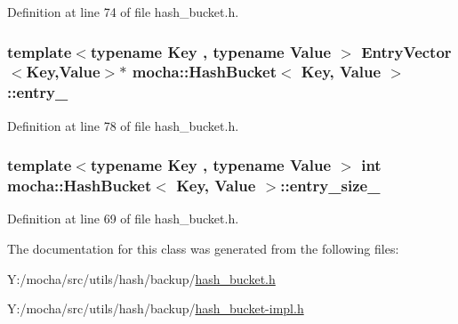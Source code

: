Definition at line 74 of file hash\_\-bucket.h.

\hypertarget{classmocha_1_1_hash_bucket_ab72765abd9c87c46dfe2994872527cbe}{
\subsubsection[{entry\_\-}]{\setlength{\rightskip}{0pt plus 5cm}template$<$typename Key , typename Value $>$ {\bf EntryVector}$<$Key,Value$>$$\ast$ {\bf mocha::HashBucket}$<$ Key, Value $>$::{\bf entry\_\-}}}
\label{classmocha_1_1_hash_bucket_ab72765abd9c87c46dfe2994872527cbe}


Definition at line 78 of file hash\_\-bucket.h.

\hypertarget{classmocha_1_1_hash_bucket_adde3d5a33a7ec825755c01cf759b8198}{
\subsubsection[{entry\_\-size\_\-}]{\setlength{\rightskip}{0pt plus 5cm}template$<$typename Key , typename Value $>$ int {\bf mocha::HashBucket}$<$ Key, Value $>$::{\bf entry\_\-size\_\-}}}
\label{classmocha_1_1_hash_bucket_adde3d5a33a7ec825755c01cf759b8198}


Definition at line 69 of file hash\_\-bucket.h.



The documentation for this class was generated from the following files:\begin{DoxyCompactItemize}
\item 
Y:/mocha/src/utils/hash/backup/\hyperlink{backup_2hash__bucket_8h}{hash\_\-bucket.h}\item 
Y:/mocha/src/utils/hash/backup/\hyperlink{hash__bucket-impl_8h}{hash\_\-bucket-\/impl.h}\end{DoxyCompactItemize}
